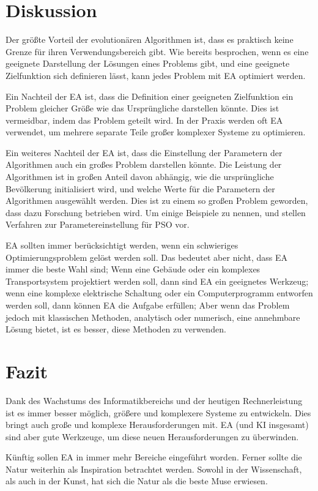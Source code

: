 \documentclass[twoside,twocolumn]{article}
\begin{document}
\section{Diskussion}
Der größte Vorteil der evolutionären Algorithmen ist, dass es praktisch keine Grenze für ihren Verwendungsbereich gibt. Wie bereits besprochen, wenn es eine geeignete Darstellung der Lösungen eines Problems gibt, und eine geeignete Zielfunktion sich definieren lässt, kann jedes Problem mit EA optimiert werden.\par
Ein Nachteil der EA ist, dass die Definition einer geeigneten Zielfunktion ein Problem gleicher Größe wie das Ursprüngliche darstellen könnte. Dies ist vermeidbar, indem das Problem geteilt wird. In der Praxis werden oft EA verwendet, um mehrere separate Teile großer komplexer Systeme zu optimieren.\par
Ein weiteres Nachteil der EA ist, dass die Einstellung der Parametern der Algorithmen auch ein großes Problem darstellen könnte. Die Leistung der Algorithmen ist in großen Anteil davon abhängig, wie die ursprüngliche Bevölkerung initialisiert wird, und welche Werte für die Parametern der Algorithmen ausgewählt werden. Dies ist zu einem so großen Problem geworden, dass dazu Forschung betrieben wird. Um einige Beispiele zu nennen, \cite{pso_tuning_a} und \cite{pso_tuning_c} stellen Verfahren zur Parametereinstellung für PSO vor.\par
EA sollten immer berücksichtigt werden, wenn ein schwieriges Optimierungsproblem gelöst werden soll. Das bedeutet aber nicht, dass EA immer die beste Wahl sind; Wenn eine Gebäude oder ein komplexes Transportsystem projektiert werden soll, dann sind EA ein geeignetes Werkzeug; wenn eine komplexe elektrische Schaltung oder ein Computerprogramm entworfen werden soll, dann können EA die Aufgabe erfüllen; Aber wenn das Problem jedoch mit klassischen Methoden, analytisch oder numerisch, eine annehmbare Lösung bietet, ist es besser, diese Methoden zu verwenden.


\section{Fazit}
Dank des Wachstums des Informatikbereichs und der heutigen Rechnerleistung ist es immer besser möglich, größere und komplexere Systeme zu entwickeln. Dies bringt auch große und komplexe Herausforderungen mit. EA (und KI insgesamt) sind aber gute Werkzeuge, um diese neuen Herausforderungen zu überwinden.\par
Künftig sollen EA in immer mehr Bereiche eingeführt worden. Ferner sollte die Natur weiterhin als Inspiration betrachtet werden. Sowohl in der Wissenschaft, als auch in der Kunst, hat sich die Natur als die beste Muse erwiesen.
\end{document}
